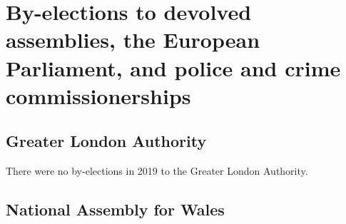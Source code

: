 \documentclass[a4paper,openany]{book}
\begin{document}
%
%
%

\chapter{By-elections to devolved assemblies, the European Parliament, and police and crime commissionerships}

\section{Greater London Authority}

There were no by-elections in 2019 to the Greater London Authority.


\section{National Assembly for Wales}
\end{document}
